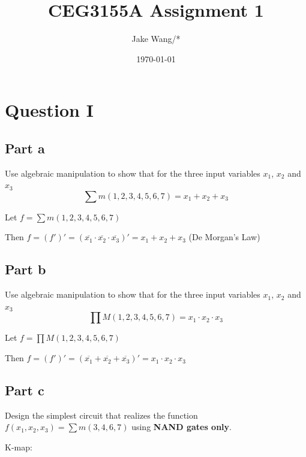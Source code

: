 \documentclass[12pt, a4paper]{article}
\title{CEG3155A Assignment 1}
\author{Jake Wang/*}
\date{\today}
\begin{document}
	\maketitle
	
	\section*{Question I}
	\subsection*{Part a}
	Use algebraic manipulation to show that for the three input variables $x_1$, $x_2$ and $x_3$
	\begin{equation}
		\sum{m(1,2,3,4,5,6,7) = x_1 + x_2 + x_3}
	\end{equation}

	Let $f = \sum{m(1,2,3,4,5,6,7)}$

	Then $f = (f')' = (\overline{x_1} \cdot \overline{x_2} \cdot \overline{x_3})' = x_1 + x_2 + x_3$ (De Morgan's Law)
	
	\subsection*{Part b}
	Use algebraic manipulation to show that for the three input variables $x_1$, $x_2$ and $x_3$
	\begin{equation}
		\prod{M(1,2,3,4,5,6,7) = x_1 \cdot x_2 \cdot x_3}
	\end{equation}

	Let $f = \prod{M(1,2,3,4,5,6,7)}$

	Then $f = (f')' = (\overline{x_1} + \overline{x_2} + \overline{x_3})' = x_1 \cdot x_2 \cdot x_3$
	
	
	\subsection*{Part c}
	Design the simplest circuit that realizes the function $f(x_1, x_2, x_3) = \sum{m(3, 4, 6, 7)}$ using \textbf{NAND gates only}.

	K-map:
	\begin{center}
	\end{center}
	
\end{document}
